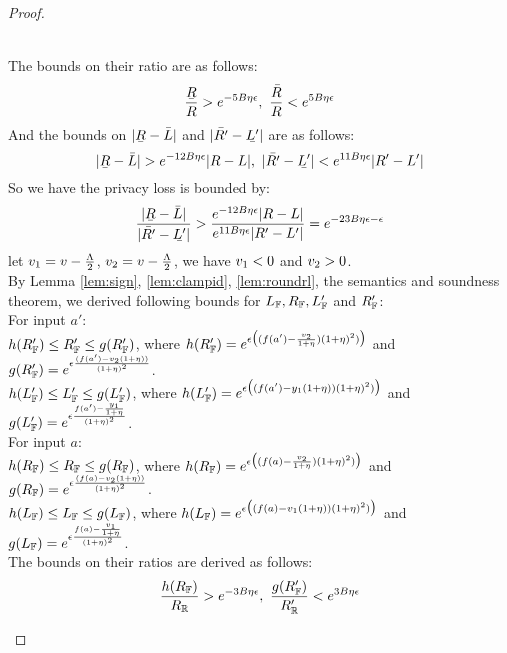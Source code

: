 \documentclass[a4paper,11pt]{article}
\begin{document}
\begin{proof}
\begin{itemize}
		\\
		The bounds on their ratio are as follows:
		\[
		\frac{\ubar{R}}{R} > e^{-5B\eta \epsilon}, 
		~ \frac{\bar{R}}{R} < e^{5B\eta \epsilon}
		\]
		And the bounds on $|\ubar{R} - \bar{L}|$ and $|\bar{R'} - \ubar{L'}|$ are as follows:
		\[
		|\ubar{R} - \bar{L}| > e^{-12 B\eta \epsilon}|R - L|, 
		~ |\bar{R'} - \ubar{L'}| < e^{11 B\eta \epsilon}|R' - L'|
		\]
		So we have the privacy loss is bounded by:
		\[
		\frac{|\ubar{R} - \bar{L}|}{|\bar{R'} - \ubar{L'}|}
		> \frac{e^{-12 B\eta \epsilon}|R - L|}{e^{11 B\eta \epsilon}|R' - L'|}
		= e^{-23B \eta \epsilon - \epsilon}
		\]
		let $v_1 = v - \frac{\Lambda}{2}$, 
		$v_2 = v - \frac{\Lambda}{2}$, 
		we have $v_1 < 0$ and $v_2 > 0$.
		\\
		By Lemma \ref{lem:sign}, \ref{lem:clampid}, \ref{lem:roundrl}, the semantics and soundness theorem, we derived following bounds for $L_{\mathbb{F}}, R_{\mathbb{F}}, L_{\mathbb{F}}'$ and $R_{\mathbb{F}}'$:
		\\
		For input $a'$:
		\\
		$h(R_{\mathbb{F}}') \leq R_{\mathbb{F}}' \leq g(R_{\mathbb{F}}')$, 
		where
		$h(R_{\mathbb{F}}') = e^{\epsilon 
				\big( (f(a') - \frac{v_2}{1 + \eta}) (1 + \eta)^2) \big)}$
		and 
		$g(R_{\mathbb{F}}') = e^{\epsilon 
				\frac{(f(a') - v_2(1 + \eta))}{(1 + \eta)^2}}$.
		\\
		$h(L_{\mathbb{F}}') \leq L_{\mathbb{F}}' \leq g(L_{\mathbb{F}}')$, 
		where
		$h(L_{\mathbb{F}}') = e^{\epsilon 
				\big( (f(a') - y_1(1 + \eta)) (1 + \eta)^2) \big)}$
		and 
		$g(L_{\mathbb{F}}') = e^{\epsilon 
				\frac{f(a') - \frac{y_1}{1 + \eta}}{(1 + \eta)^2}}$.
		\\
		For input $a$:
		\\
		$h(R_{\mathbb{F}}) \leq R_{\mathbb{F}} \leq g(R_{\mathbb{F}})$, 
		where
		$h(R_{\mathbb{F}}) = e^{\epsilon 
				\big( (f(a) - \frac{v_2}{1 + \eta}) (1 + \eta)^2) \big)}$
		and 
		$g(R_{\mathbb{F}}) = e^{\epsilon 
				\frac{(f(a) - v_2(1 + \eta))}{(1 + \eta)^2}}$.
		\\
		$h(L_{\mathbb{F}}) \leq L_{\mathbb{F}} \leq g(L_{\mathbb{F}})$, 
		where
		$h(L_{\mathbb{F}}) = e^{\epsilon 
				\big( (f(a) - v_1(1 + \eta)) (1 + \eta)^2) \big)}$
		and 
		$g(L_{\mathbb{F}}) = e^{\epsilon 
				\frac{f(a) - \frac{v_1}{1 + \eta}}{(1 + \eta)^2}}$.
		\\
		The bounds on their ratios are derived as follows:
		\[
		\frac{h(R_{\mathbb{F}})}{R_{\mathbb{R}}} > e^{-3B\eta \epsilon}, 
		~ 
		\frac{g(R_{\mathbb{F}}')}{R_{\mathbb{R}}'} < e^{3B\eta \epsilon}
\]
\end{itemize}
\end{proof}
\end{document}
